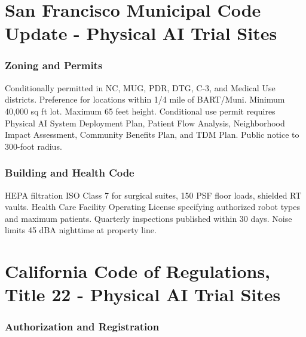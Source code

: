 \documentclass[11pt,letterpaper]{article}
\begin{document}
\newpage


\part{San Francisco Municipal Code Update - Physical AI Trial Sites}

\section{Zoning and Permits}

Conditionally permitted in NC, MUG, PDR, DTG, C-3, and Medical Use districts.
Preference for locations within 1/4 mile of BART/Muni. Minimum 40,000 sq ft
lot. Maximum 65 feet height. Conditional use permit requires Physical AI System
Deployment Plan, Patient Flow Analysis, Neighborhood Impact Assessment,
Community Benefits Plan, and TDM Plan. Public notice to 300-foot radius.

\section{Building and Health Code}

HEPA filtration ISO Class 7 for surgical suites, 150 PSF floor loads, shielded
RT vaults. Health Care Facility Operating License specifying authorized robot
types and maximum patients. Quarterly inspections published within 30 days.
Noise limits 45 dBA nighttime at property line.

\newpage


\part{California Code of Regulations, Title 22 - Physical AI Trial Sites}

\section{Authorization and Registration}
\end{document}
